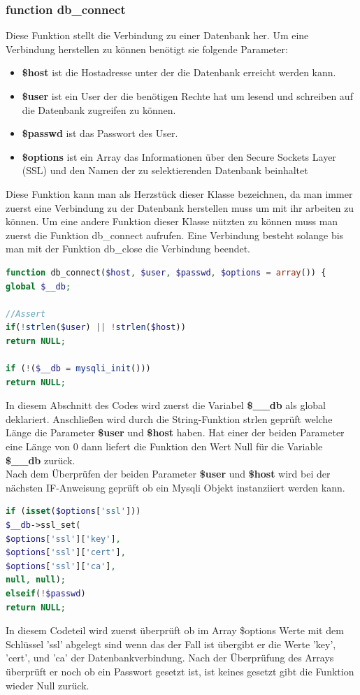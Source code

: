 \subsubsection{function db\_connect}
Diese Funktion stellt die Verbindung zu einer Datenbank her. Um eine Verbindung herstellen zu können benötigt sie folgende Parameter:
	\begin{itemize}
		\item \textbf{\$host} ist die Hostadresse unter der die Datenbank erreicht werden kann.
		\item \textbf{\$user} ist ein User der die benötigen Rechte hat um lesend und schreiben auf die Datenbank zugreifen zu können.
		\item \textbf{\$passwd} ist das Passwort des User.
		\item \textbf{\$options} ist ein Array das Informationen über den Secure Sockets Layer (SSL) und den Namen der zu selektierenden Datenbank beinhaltet
	\end{itemize}
Diese Funktion kann man als Herzstück dieser Klasse bezeichnen, da man immer zuerst eine Verbindung zu der Datenbank herstellen muss um mit ihr arbeiten zu können. Um eine andere Funktion dieser Klasse nützten zu können muss man zuerst die Funktion db\_connect aufrufen.
Eine Verbindung besteht solange bis man mit der Funktion db\_close die Verbindung beendet.
\newpage

\begin{lstlisting}[language=PHP, caption=mysqli.php/function-db\_connect1, firstnumber=21]
function db_connect($host, $user, $passwd, $options = array()) {
global $__db;

//Assert
if(!strlen($user) || !strlen($host))
return NULL;

if (!($__db = mysqli_init()))
return NULL;
\end{lstlisting}

In diesem Abschnitt des Codes wird zuerst die Variabel \textbf{\$\_\_db} als global deklariert. Anschließen wird durch die String-Funktion strlen geprüft welche Länge die Parameter \textbf{\$user} und \textbf{\$host} haben. Hat einer der beiden Parameter eine Länge von 0 dann liefert die Funktion den Wert Null für die Variable \textbf{\$\_\_db} zurück.\\
Nach dem Überprüfen der beiden Parameter \textbf{\$user} und \textbf{\$host} wird bei der nächsten IF-Anweisung geprüft ob ein Mysqli Objekt instanziiert werden kann.

\begin{lstlisting}[language=PHP, caption=mysqli.php/function-db\_connect2, firstnumber=32]
if (isset($options['ssl']))
$__db->ssl_set(
$options['ssl']['key'],
$options['ssl']['cert'],
$options['ssl']['ca'],
null, null);
elseif(!$passwd)
return NULL;
\end{lstlisting}
In diesem Codeteil wird zuerst überprüft ob im Array \$options Werte mit dem Schlüssel 'ssl' abgelegt sind wenn das der Fall ist übergibt er die Werte 'key', 'cert', und 'ca' der Datenbankverbindung. Nach der Überprüfung des Arrays überprüft er noch ob ein Passwort gesetzt ist, ist keines gesetzt gibt die Funktion wieder Null zurück.

